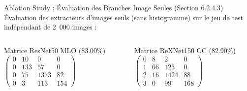 \documentclass[10pt, compress]{beamer}
\begin{document}
\begin{frame}{Ablation Study : Évaluation des Branches Image Seules (Section 6.2.4.3)}
    Évaluation des extracteurs d'images seuls (sans histogramme) sur le jeu de test indépendant de 2~000 images :

    \begin{table}[h]
        \centering
        \caption{Performances des extracteurs d'images seuls sur le jeu de test indépendant.}
    \end{table}

    \begin{columns}
        \begin{column}{0.5\textwidth}
            \begin{block}{Matrice ResNet50 MLO (83.00\%)}
                \small
                $\begin{pmatrix} 
                0 & 10 & 0 & 0 \\ 
                0 & 133 & 57 & 0 \\ 
                0 & 75 & 1373 & 82 \\ 
                0 & 3 & 113 & 154 
                \end{pmatrix}$
            \end{block}
        \end{column}
        \begin{column}{0.5\textwidth}
            \begin{block}{Matrice ReXNet150 CC (82.90\%)}
                \small
                $\begin{pmatrix} 
                0 & 8 & 2 & 0 \\ 
                1 & 66 & 123 & 0 \\ 
                2 & 16 & 1424 & 88 \\ 
                3 & 0 & 99 & 168 
                \end{pmatrix}$
            \end{block}
        \end{column}
    \end{columns}
\end{frame}
\end{document}
